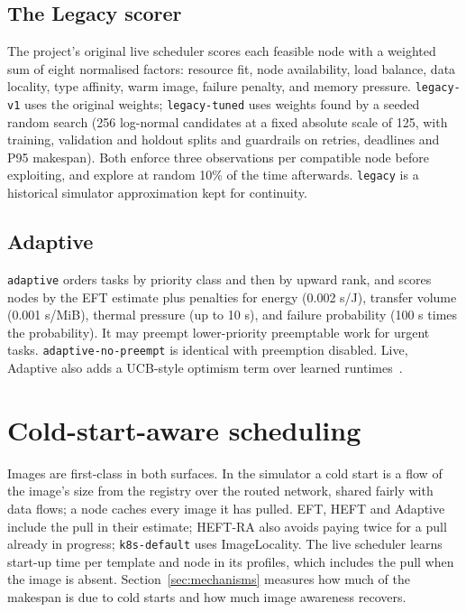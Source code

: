 \documentclass[12pt,a4paper]{report}
\newcommand{\pol}[1]{\texttt{#1}}
\begin{document}
\subsection{The Legacy scorer}

The project's original live scheduler scores each feasible node with a
weighted sum of eight normalised factors: resource fit, node availability,
load balance, data locality, type affinity, warm image, failure penalty,
and memory pressure. \pol{legacy-v1} uses the original weights;
\pol{legacy-tuned} uses weights found by a seeded random search (256
log-normal candidates at a fixed absolute scale of 125, with training,
validation and holdout splits and guardrails on retries, deadlines and
P95 makespan). Both enforce three observations per compatible node before
exploiting, and explore at random 10\% of the time afterwards.
\pol{legacy} is a historical simulator approximation kept for continuity.

\subsection{Adaptive}

\pol{adaptive} orders tasks by priority class and then by upward rank, and
scores nodes by the EFT estimate plus penalties for energy (0.002 s/J),
transfer volume (0.001 s/MiB), thermal pressure (up to 10 s), and failure
probability (100 s times the probability). It may preempt lower-priority
preemptable work for urgent tasks. \pol{adaptive-no-preempt} is identical
with preemption disabled. Live, Adaptive also adds a UCB-style optimism
term over learned runtimes~\cite{auer2002ucb}.

\section{Cold-start-aware scheduling}

Images are first-class in both surfaces. In the simulator a cold start is
a flow of the image's size from the registry over the routed network,
shared fairly with data flows; a node caches every image it has pulled.
EFT, HEFT and Adaptive include the pull in their estimate; HEFT-RA also
avoids paying twice for a pull already in progress;
\pol{k8s-default} uses ImageLocality. The live scheduler learns start-up
time per template and node in its profiles, which includes the pull when
the image is absent. Section~\ref{sec:mechanisms} measures how much of
the makespan is due to cold starts and how much image awareness recovers.
\end{document}
